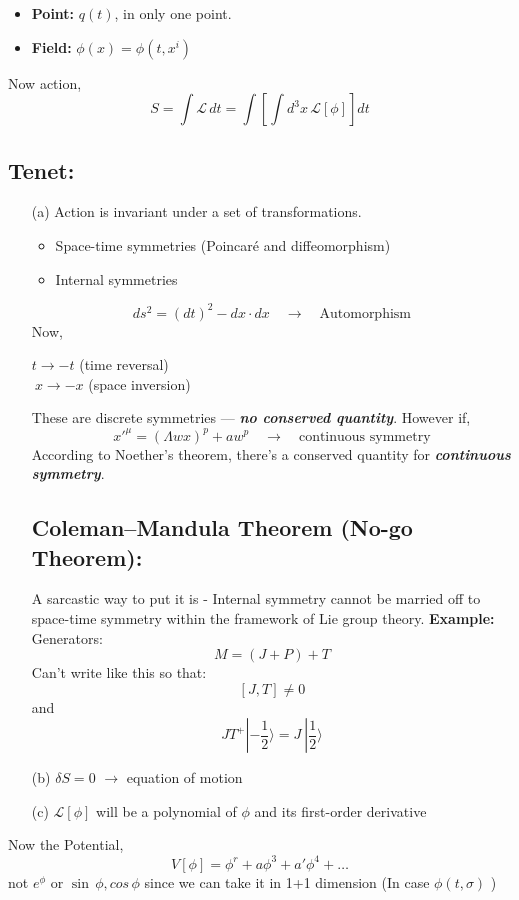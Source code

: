 \documentclass[14pt]{article} %
\begin{document}
\vspace{-1cm}
\begin{itemize}
    \item \textbf{Point:} $q(t)$, in only one point.
    \item \textbf{Field:} $\phi(x) = \phi(t, x^i)$
\end{itemize}
Now action,
\[
S = \int \mathcal{L} \, dt = \int \left[ \int d^3x \, \mathcal{L}[\phi] \right] dt
\]
\subsection*{Tenet:}
\begin{enumerate}
    \item[(a)] Action is invariant under a set of transformations.
    \begin{itemize}
        \item Space-time symmetries (Poincaré and diffeomorphism)
        \item Internal symmetries
    \end{itemize}
    \[
    ds^2 = (dt)^2 - dx \cdot dx \quad \to \quad \text{Automorphism}
    \]
Now,
\vspace{-0.5cm}
\begin{center}
    $t \rightarrow -t$ \quad (time reversal) \\
    $~x \rightarrow -x$ \quad (space inversion)
\end{center}
These are discrete symmetries — \textbf{\textit{no conserved quantity}}. However if,
\[
x'^\mu = (\Lambda wx)^p + aw^p \quad \to \quad \text{continuous symmetry}
\]
According to Noether’s theorem, there's a conserved quantity for \textbf{\textit{continuous symmetry}}.

\begin{tcolorbox}[ title=Notes]
\subsection*{Coleman–Mandula Theorem (No-go Theorem):}
A sarcastic way to put it is - Internal symmetry cannot be married off to space-time symmetry within the framework of Lie group theory. \textbf{Example:} Generators:
\[
M = (J + P) + T
\]
Can't write like this so that:
\[
[J, T] \ne 0
\]
and
\[
JT^+ |-\frac{1}{2} \rangle = J~ |\frac{1}{2} \rangle
\]
\end{tcolorbox}

    \item[(b)] $\delta S = 0$ \quad $\to$ equation of motion
    \item[(c)] $\mathcal{L}[\phi]$ will be a polynomial of $\phi$ and its first-order derivative
\end{enumerate}
Now the Potential,
\[
V[\phi] = \phi^r + a \phi^3 + a' \phi^4 + \dots
\]
not  $e^\phi$ or $\sin\, \phi, cos\,\phi$ since we can take it in 1+1 dimension (In case $\phi(t, \sigma)$ )
\end{document}
